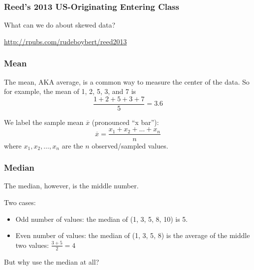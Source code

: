 \documentclass[handout]{beamer}
\newcommand{\blue}[1]{\textcolor{blue2}{#1}}
\begin{document}
\begin{frame}
\frametitle{Reed's 2013 US-Originating Entering Class}
What can we do about skewed data?  

\vspace{1cm}

\blue{\url{http://rpubs.com/rudeboybert/reed2013}}

\end{frame}


\begin{frame}[fragile]
\frametitle{Mean}
The mean, AKA average, is a common way to measure the \blue{center} of the data.  So for example, the mean of 1, 2, 5, 3, and 7 is 
\[\frac{1 + 2 + 5 + 3 + 7}{5} = 3.6\]

\pause We label the \blue{sample mean} $\overline{x}$ (pronounced ``x bar''):
\[
\overline{x} = \frac{x_1 + x_2 + \ldots + x_n}{n}
\]
where $x_1, x_2, \ldots, x_n$ are the $n$ observed/sampled values.  
\end{frame}


\begin{frame}[fragile]
\frametitle{Median}
The \blue{median}, however, is the \blue{middle number}.

\vspace{0.5cm}

\pause Two cases:
\begin{itemize}
\item Odd number of values: the median of (1, 3, \blue{5}, 8, 10) is 5.
\item Even number of values: the median of (1, \blue{3, 5}, 8) is the average of the middle two values: $\frac{3+5}{2} = 4$
\end{itemize}

\vspace{0.5cm}

\pause But why use the median at all?

\end{frame}
\end{document}
